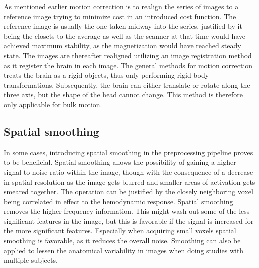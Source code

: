 As mentioned earlier motion correction is to realign the series of images to a reference image trying to minimize cost in an introduced cost function. The reference image is usually the one taken midway into the series, justified by it being the closets to the average as well as the scanner at that time would have achieved maximum stability, as the magnetization would have reached steady state. The images are thereafter realigned utilizing an image registration method as it register the brain in each image. The general methods for motion correction treats the brain as a rigid objects, thus only performing rigid body transformations. Subsequently, the brain can either translate or rotate along the three axis, but the shape of the head cannot change. This method is therefore only applicable for bulk motion. \cite{Poldrack2011} 

\subsection{Spatial smoothing}

In some cases, introducing spatial smoothing in the preprocessing pipeline proves to be beneficial. Spatial smoothing allows the possibility of gaining a higher signal to noise ratio within the image, though with the consequence of a decrease in spatial resolution as the image gets blurred and smaller areas of activation gets smeared together. The operation can be justified by the closely neighboring voxel being correlated in effect to the hemodynamic response. Spatial smoothing removes the higher-frequency information. This might wash out some of the less significant features in the image, but this is favorable if the signal is increased for the more significant features. Especially when acquiring small voxels spatial smoothing is favorable, as it reduces the overall noise. Smoothing can also be applied to lessen the anatomical variability in images when doing studies with multiple subjects. \cite{Poldrack2011}

